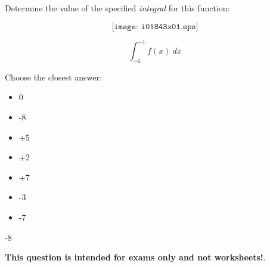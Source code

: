 

Determine the value of the specified {\it integral} for this function:

$$\texttt{[image: i01843x01.eps]}$$

$$\int_{-6}^{-1} f(x) \> dx$$

Choose the closest answer:

\begin{itemize}
\item{} 0
\vskip 10pt 
\item{} -8
\vskip 10pt 
\item{} +5
\vskip 10pt 
\item{} +2
\vskip 10pt 
\item{} +7
\vskip 10pt 
\item{} -3
\vskip 10pt 
\item{} -7
\end{itemize}








-8






{\bf This question is intended for exams only and not worksheets!}.



